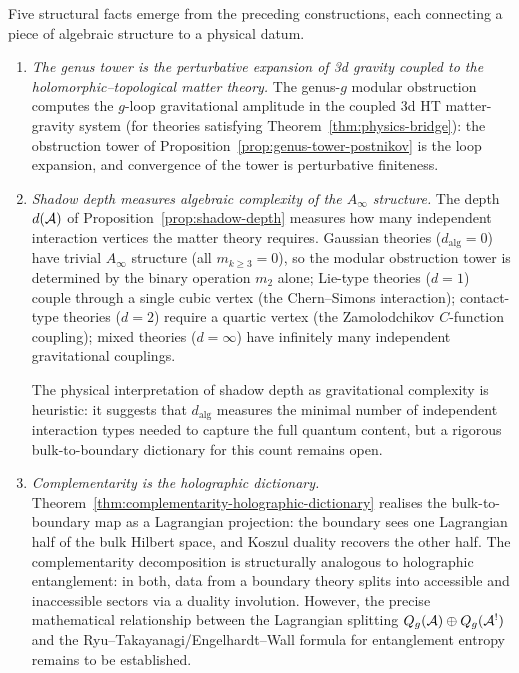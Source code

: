 \begin{remark}
\label{rem:modular-homotopy-reveals}
Five structural facts emerge from the preceding constructions,
each connecting a piece of algebraic structure to a physical
datum.

\begin{enumerate}[label=(\alph*),leftmargin=1.8em]
\item
\emph{The genus tower is the perturbative expansion of 3d
gravity coupled to the holomorphic--topological matter theory.}
The genus-$g$ modular obstruction computes the $g$-loop
gravitational amplitude in the coupled 3d HT matter-gravity
system (for theories satisfying
Theorem~\ref{thm:physics-bridge}): the obstruction tower of
Proposition~\ref{prop:genus-tower-postnikov} is the loop
expansion, and convergence of the tower is perturbative
finiteness.

\item
\emph{Shadow depth measures algebraic complexity of the $A_\infty$ structure.}
The depth $d(\mathcal{A})$ of
Proposition~\ref{prop:shadow-depth} measures how many
independent interaction vertices the matter theory requires.
Gaussian theories ($d_{\mathrm{alg}}=0$) have trivial
$A_\infty$ structure (all $m_{k\ge 3}=0$), so the modular
obstruction tower is determined by the binary operation $m_2$
alone;
Lie-type theories ($d=1$) couple through a single cubic
vertex (the Chern--Simons interaction);
contact-type theories ($d=2$) require a quartic vertex (the
Zamolodchikov $C$-function coupling); mixed theories
($d=\infty$) have infinitely many independent gravitational
couplings.

The physical interpretation of shadow depth as gravitational
complexity is heuristic: it suggests that $d_{\mathrm{alg}}$
measures the minimal number of independent interaction types
needed to capture the full quantum content, but a rigorous
bulk-to-boundary dictionary for this count remains open.

\item
\emph{Complementarity is the holographic dictionary.}
Theorem~\ref{thm:complementarity-holographic-dictionary}
realises the bulk-to-boundary map as a Lagrangian projection:
the boundary sees one Lagrangian half of the bulk Hilbert
space, and Koszul duality recovers the other half.
The complementarity decomposition is structurally analogous to
holographic entanglement: in both, data from a boundary theory
splits into accessible and inaccessible sectors via a duality
involution. However, the precise mathematical relationship
between the Lagrangian splitting
$Q_g(\mathcal{A}) \oplus Q_g(\mathcal{A}^!)$ and the
Ryu--Takayanagi/Engelhardt--Wall formula for entanglement
entropy remains to be established.


\end{enumerate}
\end{remark}
